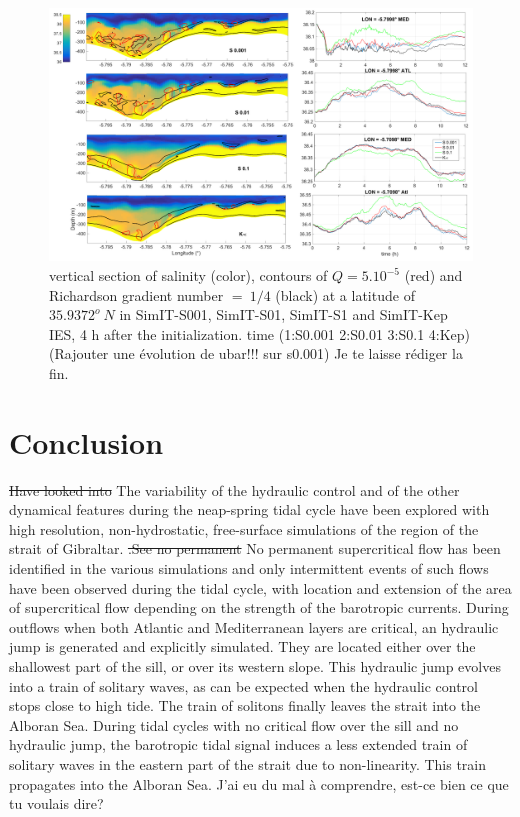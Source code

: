 \begin{figure}[!h]
 \includegraphics[width=\textwidth]{./GBR3D/Figsmago.png}
 \caption { \color{blue}vertical section of salinity (color), contours of $Q=5.10^{-5}$ (red) and Richardson gradient number $=\ 1/4$ (black) at a latitude of $35.9372^o\ N$ in SimIT-S001, SimIT-S01, SimIT-S1 and SimIT-Kep IES, 4 h after the initialization.  \color{green}time  (1:S0.001  2:S0.01  3:S0.1 4:Kep)(Rajouter une évolution de ubar!!! sur s0.001) Je te laisse rédiger la fin. \color{black}}
 \label{Fig3Dsch}
\end{figure}

\section{Conclusion}

 \color{blue}\sout{Have looked into} The variability of the hydraulic control and of the other dynamical features during the neap-spring tidal cycle have been explored with high resolution, non-hydrostatic, free-surface simulations of the region of the strait of Gibraltar. \sout{.See no permanent} No permanent supercritical flow has been identified in the various simulations and only intermittent events of such flows have been observed during the tidal cycle, with location and extension of the area of supercritical flow depending on the strength of the barotropic currents. \color{black}
\color{blue}During outflows when both Atlantic and Mediterranean layers are critical, an hydraulic jump is generated and explicitly simulated. They are located \color{black} either over the shallowest part of the sill, or over its western slope.  \color{blue}This hydraulic jump evolves into a train of solitary waves, as can be expected when the hydraulic control stops close to high tide. The train of solitons finally leaves the strait into the Alboran Sea. 
During tidal cycles with no critical flow over the sill and no hydraulic jump, the barotropic tidal signal induces a less extended train of solitary waves in the eastern part of the strait due to non-linearity. This train propagates into the Alboran Sea.  \color{green}J'ai eu du mal à comprendre, est-ce bien ce que tu voulais dire? \color{black}

